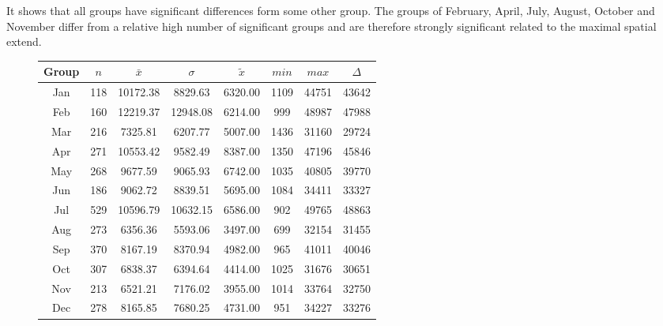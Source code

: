 It shows that all groups have significant differences form some other group. The groups of February, April, July, August, October and November differ from a relative high number of significant groups and are therefore strongly significant related to the maximal spatial extend.
\begin{figure}[ht!]
	\centering
	\begin{minipage}{0.5\textwidth}
		\tiny
		\setlength{\tabcolsep}{4pt}
		\centering
		\begin{tabular}{c|c|c|c|c|c|c|c}
			\toprule
			Group & $n$ & $\bar{x}$ & $\sigma$ & $\tilde{x}$ & $min$ & $max$ & $\Delta$ \\
			\midrule
			Jan & 118 & 10172.38 & 8829.63  & 6320.00 & 1109 & 44751 & 43642 \\
			Feb & 160 & 12219.37 & 12948.08 & 6214.00 & 999  & 48987 & 47988 \\
			Mar & 216 & 7325.81  & 6207.77  & 5007.00 & 1436 & 31160 & 29724 \\
			Apr & 271 & 10553.42 & 9582.49  & 8387.00 & 1350 & 47196 & 45846 \\
			May & 268 & 9677.59  & 9065.93  & 6742.00 & 1035 & 40805 & 39770 \\
			Jun & 186 & 9062.72  & 8839.51  & 5695.00 & 1084 & 34411 & 33327 \\
			Jul & 529 & 10596.79 & 10632.15 & 6586.00 & 902  & 49765 & 48863 \\
			Aug & 273 & 6356.36  & 5593.06  & 3497.00 & 699  & 32154 & 31455 \\
			Sep & 370 & 8167.19  & 8370.94  & 4982.00 & 965  & 41011 & 40046 \\
			Oct & 307 & 6838.37  & 6394.64  & 4414.00 & 1025 & 31676 & 30651 \\ 
			Nov & 213 & 6521.21  & 7176.02  & 3955.00 & 1014 & 33764 & 32750 \\
			Dec & 278 & 8165.85  & 7680.25  & 4731.00 & 951  & 34227 & 33276 \\
			\bottomrule
		\end{tabular}
		\label{tbl:descriptives_arbis_matched_Month_SMax}
	\end{minipage}%
	\begin{minipage}{0.55\textwidth}
\end{minipage}
\end{figure}
